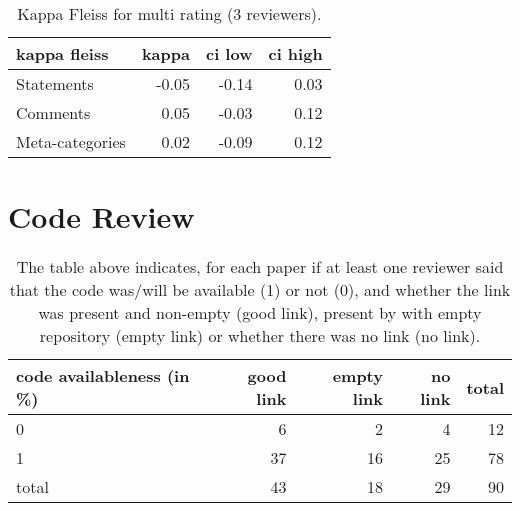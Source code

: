 \documentclass{article}
\begin{document}
\begin{table}[H]

\centering

\begin{tabular}{lrrr}
\hline
 kappa fleiss    &   kappa &   ci low &   ci high \\
\hline
 Statements      &   -0.05 &    -0.14 &      0.03 \\
 Comments        &    0.05 &    -0.03 &      0.12 \\
 Meta-categories &    0.02 &    -0.09 &      0.12 \\
\hline
\end{tabular}\caption{Kappa Fleiss for multi rating (3 reviewers).}

\end{table}



\section{Code Review} 

\begin{table}[H]

\centering

\begin{tabular}{lrrrr}
\hline
 code availableness (in \%)   &   good link &   empty link &   no link &   total \\
\hline
 0                           &           6 &            2 &         4 &      12 \\
 1                           &          37 &           16 &        25 &      78 \\
 total                       &          43 &           18 &        29 &      90 \\
\hline
\end{tabular}\caption{The table above indicates, for each paper if at least one reviewer said that the 
 code was/will be available (1) or not (0), and whether the link was present and non-empty (good link), 
 present by with empty repository (empty link) or whether there was no link (no link).}

\end{table}
\end{document}
